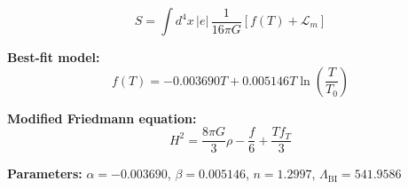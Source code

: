 
\begin{equation}
  S = \int d^4x \, |e| \, \frac{1}{16\pi G} \left[ f(T) + \mathcal{L}_m \right]
\end{equation}

\textbf{Best-fit model:}
\begin{equation}
  f(T) = -0.003690 T + 0.005146 T \ln\!\left(\frac{T}{T_0}\right)
\end{equation}

\textbf{Modified Friedmann equation:}
\begin{equation}
  H^2 = \frac{8\pi G}{3} \rho - \frac{f}{6} + \frac{T f_T}{3}
\end{equation}

\textbf{Parameters:}
$\alpha = -0.003690$, \quad
$\beta = 0.005146$, \quad
$n = 1.2997$, \quad
$\Lambda_{\text{BI}} = 541.9586$